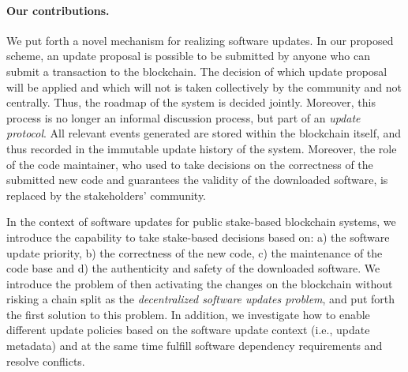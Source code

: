 \paragraph{Our contributions.}
We put forth a novel mechanism for realizing software updates. In our proposed scheme, an update proposal is possible to be submitted by anyone who can submit a transaction to the blockchain. The decision of which update proposal will be applied and which will not is taken collectively by the community and not centrally. Thus, the roadmap of the system is decided jointly. Moreover, this process is no longer an informal discussion process, but part of an \emph{update protocol}. All relevant events generated are stored within the blockchain itself, and thus recorded in the immutable update history of the system. Moreover, the role of the code maintainer, who used to take decisions on the correctness of the submitted new code and guarantees the validity of the downloaded software, is replaced by the stakeholders' community.

In the context of software updates for public stake-based blockchain systems, we introduce the capability to take stake-based decisions
 based on: a) the software update priority, b) the correctness of the new code, c) the maintenance of the code base and d) the authenticity and safety of the downloaded software. We introduce the problem of then activating the changes on the blockchain without risking a chain split
 as the \emph{decentralized software updates problem}, and put forth the first solution to this problem. In addition, we investigate how to enable different update policies based on the software update context (i.e., update metadata) and at the same time fulfill software dependency requirements and resolve conflicts.


